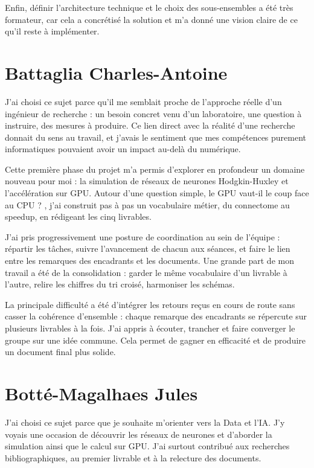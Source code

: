 \documentclass{report}
\begin{document}
Enfin, définir l'architecture technique et le choix des sous-ensembles a été très formateur, car cela a concrétisé la solution et m'a donné une vision claire de ce qu'il reste à implémenter.

\chapter{Battaglia Charles-Antoine}

J'ai choisi ce sujet parce qu'il me semblait proche de l'approche réelle d'un ingénieur de recherche : un besoin concret venu d'un laboratoire, une question à instruire, des mesures à produire. Ce lien direct avec la réalité d'une recherche donnait du sens au travail, et j'avais le sentiment que mes compétences purement informatiques pouvaient avoir un impact au-delà du numérique.

Cette première phase du projet m'a permis d'explorer en profondeur un domaine nouveau pour moi : la simulation de réseaux de neurones Hodgkin-Huxley et l'accélération sur GPU. Autour d'une question simple, \og le GPU vaut-il le coup face au CPU ? \fg, j'ai construit pas à pas un vocabulaire métier, du connectome au speedup, en rédigeant les cinq livrables.

J'ai pris progressivement une posture de coordination au sein de l'équipe : répartir les tâches, suivre l'avancement de chacun aux séances, et faire le lien entre les remarques des encadrants et les documents. Une grande part de mon travail a été de la consolidation : garder le même vocabulaire d'un livrable à l'autre, relire les chiffres du tri croisé, harmoniser les schémas. 

La principale difficulté a été d'intégrer les retours reçus en cours de route sans casser la cohérence d'ensemble : chaque remarque des encadrants se répercute sur plusieurs livrables à la fois. J'ai appris à écouter, trancher et faire converger le groupe sur une idée commune. Cela permet de gagner en efficacité et de produire un document final plus solide.

\chapter{Botté-Magalhaes Jules}
J’ai choisi ce sujet parce que je souhaite m’orienter vers la Data et l’IA. J’y voyais une occasion de découvrir les réseaux de neurones et d’aborder la simulation ainsi que le calcul sur GPU. J’ai surtout contribué aux recherches bibliographiques, au premier livrable et à la relecture des documents.
\end{document}
